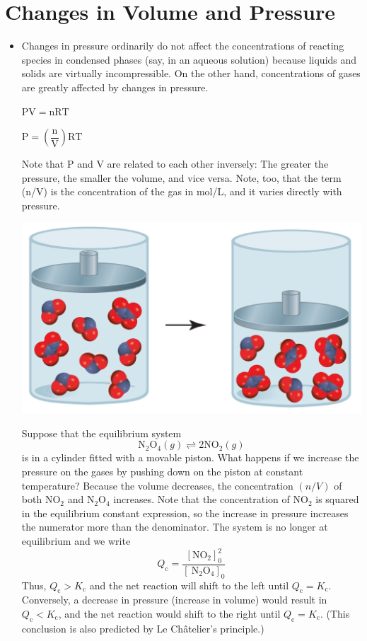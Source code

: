 \documentclass[a4paper,12pt,twocolumn]{article}
\begin{document}
\section{Changes in Volume and Pressure}
\begin{itemize}
    \item Changes in pressure ordinarily do not affect the concentrations of reacting species in 
          condensed phases (say, in an aqueous solution) because liquids and solids are virtually 
          incompressible. On the other hand, concentrations of gases are greatly affected by 
          changes in pressure.
          \begin{center}
            $\mathrm{P V  =n R T}$ \\
          \end{center}
          \begin{center}
            $\mathrm{P  =\left(\dfrac{n}{V}\right) R T}$
          \end{center}
          Note that P and V are related to each other inversely: The greater the pressure, the 
          smaller the volume, and vice versa. Note, too, that the term (n/V) is the concentration 
          of the gas in mol/L, and it varies directly with pressure.
          \begin{center}
            \includegraphics[width=.3\textwidth]{Screenshot 2023-03-22 235304.png}
          \end{center}
          Suppose that the equilibrium system
          $$
          \mathrm{N}_2 \mathrm{O}_4(g) \rightleftharpoons 2 \mathrm{NO}_2(g)
          $$
          is in a cylinder fitted with a movable piston. What happens if we increase the pressure on the gases by pushing down on the piston at constant temperature? Because the volume decreases, the concentration $(n / V)$ of both $\mathrm{NO}_2$ and $\mathrm{N}_2 \mathrm{O}_4$ increases. Note that the concentration of $\mathrm{NO}_2$ is squared in the equilibrium constant expression, so the increase in pressure increases the numerator more than the denominator. The system is no longer at equilibrium and we write
          $$
          Q_{\mathrm{c}}=\frac{\left[\mathrm{NO}_2\right]_0^2}{\left[\mathrm{~N}_2 \mathrm{O}_4\right]_0}
          $$
          Thus, $Q_{\mathrm{c}}>K_{\mathrm{c}}$ and the net reaction will shift to the left until $Q_{\mathrm{c}}=K_{\mathrm{c}}$. Conversely, a decrease in pressure (increase in volume) would result in $Q_{\mathrm{c}}<K_{\mathrm{c}}$, and the net reaction would shift to the right until $Q_{\mathrm{c}}=K_{\mathrm{c}}$. (This conclusion is also predicted by Le Châtelier's principle.)
          

\end{itemize}
\end{document}
